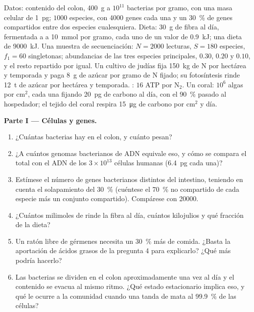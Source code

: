 \begin{problem}
\label{pb:b3:microbiomes:1}
Datos: contenido del colon, \qty{400}{g} a $10^{11}$ bacterias por gramo,
con una masa celular de \qty{1}{pg}; $1000$ especies, con \num{4000}
genes cada una y un \qty{30}{\%} de genes compartidos entre dos especies
cualesquiera. Dieta: \qty{30}{g} de fibra al día, fermentada a  a \qty{10}{mmol} por gramo, cada uno de un valor
de \qty{0.9}{kJ}; una dieta de \qty{9000}{kJ}. Una muestra de
secuenciación: $N = 2000$ lecturas, $S = 180$ especies, $f_{1} = 60$
singletonas; abundancias de las tres especies principales, $0.30$, $0.20$
y $0.10$, y el resto repartido por igual. Un cultivo de judías fija
\qty{150}{kg} de N por hectárea y temporada y paga \qty{8}{g} de azúcar
por gramo de N fijado; su fotosíntesis rinde \qty{12}{t} de azúcar por
hectárea y temporada. : $16$ ATP por N$_{2}$. Un coral:
$10^{6}$ algas por cm$^{2}$, cada una fijando \qty{20}{pg} de carbono al
día, con el \qty{90}{\%} pasado al hospedador; el tejido del coral
respira \qty{15}{\micro g} de carbono por cm$^{2}$ y día.

\medskip
\noindent\textbf{Parte I --- Células y genes.}
\begin{enumerate}
  \item ¿Cuántas bacterias hay en el colon, y cuánto pesan?
  \item ¿A cuántos genomas bacterianos de ADN equivale eso, y cómo se
        compara el total con el ADN de los $3\times 10^{13}$ células
        humanas (\qty{6.4}{pg} cada una)?
  \item Estímese el número de genes bacterianos distintos del intestino,
        teniendo en cuenta el solapamiento del \qty{30}{\%} (cuéntese el
        \qty{70}{\%} no compartido de cada especie más un conjunto
        compartido). Compárese con \num{20000}.
  \item ¿Cuántos milimoles de  rinde la
        fibra al día, cuántos kilojulios y qué fracción de la dieta?
  \item Un ratón libre de gérmenes necesita un \qty{30}{\%} más de
        comida. ¿Basta la aportación de ácidos grasos de la pregunta 4
        para explicarlo? ¿Qué más podría hacerlo?
  \item Las bacterias se dividen en el colon aproximadamente una vez al
        día y el contenido se evacua al mismo ritmo. ¿Qué estado
        estacionario implica eso, y qué le ocurre a la comunidad cuando
        una tanda de  mata al \qty{99.9}{\%} de las células?
\end{enumerate}


\end{problem}
